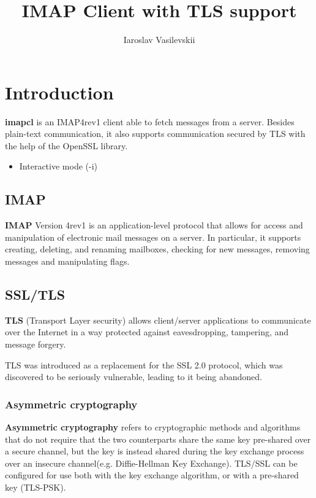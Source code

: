 \documentclass[a4]{report}
\title{IMAP Client with TLS support}
\author{Iaroslav Vasilevskii}
\begin{document}
\maketitle
\tableofcontents

\chapter{Introduction}

{\Large\textbf{imapcl}} is an IMAP4rev1\cite{rfc3501} client able to fetch messages from a server. Besides plain-text communication, it also supports communication secured by TLS with the help of the OpenSSL library.

\begin{itemize}
  \item Interactive mode (-i)
\end{itemize}

\section{IMAP}

\textbf{IMAP} Version 4rev1 is an application-level protocol that allows for access and manipulation of electronic mail messages on a server. In particular, it supports creating, deleting, and renaming mailboxes, checking for new messages, removing messages and manipulating flags\cite{rfc3501}.

\section{SSL/TLS}

\textbf{TLS} (Transport Layer security) allows client/server applications to communicate over the Internet in a way protected against eavesdropping, tampering, and message forgery\cite{rfc8446}.

TLS was introduced as a replacement for the SSL 2.0 protocol, which was discovered to be seriously vulnerable, leading to it being abandoned\cite{rfc6176}.

\subsection{Asymmetric cryptography}

\textbf{Asymmetric cryptography} refers to cryptographic methods and algorithms that do not require that the two counterparts share the same key pre-shared over a secure channel, but the key is instead shared during the key exchange process over an insecure channel(e.g. Diffie-Hellman Key Exchange). TLS/SSL can be configured for use both with the key exchange algorithm, or with a pre-shared key (TLS-PSK)\cite{8446}.
\end{document}
